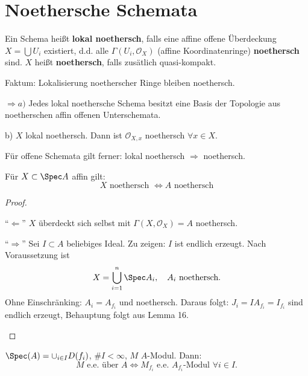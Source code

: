 \section{Noethersche Schemata }
\begin{defn}[14]
  Ein Schema heißt \textbf{lokal noethersch}, falls eine affine offene
  Überdeckung $X=\bigcup U_{i}$ existiert, d.d. alle $\Gamma(U_{i},\mathcal{O}_{X})$
  (affine Koordinatenringe) \textbf{noethersch} sind. $X$ heißt \textbf{noethersch},
  falls zusätlich quasi-kompakt.
\end{defn}

Faktum: Lokalisierung noetherscher Ringe bleiben noethersch.

$\Rightarrow a)$ Jedes lokal noethersche Schema besitzt eine Basis
der Topologie aus noetherschen affin offenen Unterschemata.

b) $X$ lokal noethersch. Dann ist $\mathcal{O}_{X,x}$ noethersch
$\forall x\in X$.

Für offene Schemata gilt ferner: lokal noethersch $\Rightarrow$ noethersch.

\begin{prop}[15]
  Für $X\subset\Spec A$ affin gilt:
  \[
    X\text{ noethersch }\Leftrightarrow A\text{ noethersch}
  \]
\end{prop}

\begin{proof}
  \mbox{}
  \begin{casenv}
  \item[``$\Leftarrow$''] $X$ überdeckt sich selbst mit $\Gamma(X,\mathcal{O}_{X})=A$ noethersch.
  \item[``$\Rightarrow$''] Sei $I\subset A$ beliebiges Ideal. Zu zeigen: $I$ ist endlich erzeugt.
    Nach Voraussetzung ist
    \[
      X=\bigcup_{i=1}^{n}\Spec A_{i},\quad A_{i}\text{ noethersch}.
    \]
    Ohne Einschränking: $A_{i}=A_{f_{i}}$ und noethersch. Daraus folgt:
    $J_{i}=IA_{f_{i}}=I_{f_{i}}$ sind endlich erzeugt, Behauptung folgt
    aus Lemma 16.
  \end{casenv}
\end{proof}
\begin{lem}[16]
  $\Spec(A)=\cup_{i\in I}D(f_{i})$, $\#I<\infty$, $M$ $A$-Modul.
  Dann:
  \[
    M\text{ e.e. über }A\Leftrightarrow M_{f_{i}}\text{ e.e. }A_{f_{i}}\text{-Modul }\forall i\in I.
  \]
\end{lem}

